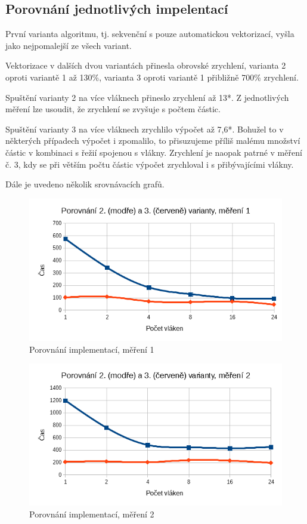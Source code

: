 \documentclass[12pt]{article}
\begin{document}
\subsection{Porovnání jednotlivých impelentací}
První varianta algoritmu, tj. sekvenční s pouze automatickou vektorizací, vyšla jako nejpomalejší ze všech variant.

Vektorizace v dalších dvou variantách přinesla obrovské zrychlení, varianta 2 oproti variantě 1 až 130\%, varianta 3 oproti variantě 1 přibližně 700\% zrychlení.

Spuštění varianty 2 na více vláknech přineslo zrychlení až 13*. Z jednotlivých měření lze usoudit, že zrychlení se zvyšuje s počtem částic.

Spuštění varianty 3 na více vláknech zrychlilo výpočet až 7,6*.
Bohužel to v některých případech výpočet i zpomalilo, to přisuzujeme příliš malému množství částic v kombinaci s řežií spojenou s vlákny.
Zrychlení je naopak patrné v měření č. 3, kdy se při větším počtu částic výpočet zrychloval i s přibývajícími vlákny.

Dále je uvedeno několik srovnávacích grafů.

\begin{figure}[h]
  \begin{center}
      \includegraphics[width=12cm]{images/vs1.png}	
    \caption{Porovnání implementací, měření 1} 
  \end{center}
\end{figure}

\begin{figure}[h]
  \begin{center}
      \includegraphics[width=12cm]{images/vs2.png}	
    \caption{Porovnání implementací, měření 2}
  \end{center}
\end{figure}
\end{document}
